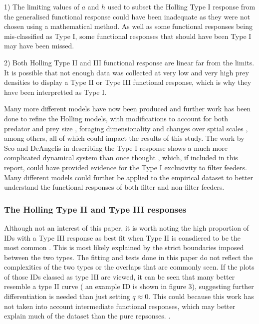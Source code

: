 \documentclass[11pt, a4paper, titlepage]{article}
\begin{document}
1) The limiting values of $a$ and $h$ used to subset the Holling Type I response from the generalised functional response could have been inadequate as they were not chosen using a mathematical method. As well as some functional responses being mis-classified as Type I, some functional responses that should have been Type I may have been missed.

2) Both Holling Type II and III functional response are linear far from the limits. It is possible that not enough data was collected at very low and very high prey densities to display a Type II or Type III functional response, which is why they have been interpretted as Type I.

Many more different models have now been produced and  further work has been done to refine the Holling models, with modifications to account for both predator and prey size \parencite{Aljetlawi2004}, foraging dimensionality \parencite{Pawar2012} and changes over sptial scales  \parencite{Rincon2017}, among others, all of which could impact the results of this study. The work by Seo and DeAngelis in describing the Type I response shows a much more complicated dynamical system than once thought \parencite{Seo2011}, which, if included in this report, could have provided evidence for the Type I exclusivity to filter feeders. Many different models could further be applied to the empirical dataset to better understand the functional responses of both filter and non-filter feeders.

\subsubsection{The Holling Type II and Type III responses}

Although not an interest of this paper, it is worth noting the high proportion of IDs with a Type III response as best fit when Type II is consdiered to be the most common \parencite{Holling1959b}. This is most likely explained by the strict boundaries imposed between the two types. The fitting and tests done in this paper do not reflect the complexities of the two types or the overlaps that are commonly seen. If the plots of those IDs classed as type III are viewed, it can be seen that many better resemble a type II curve ( an example ID is shown in figure 3), suggesting further differentiation is needed than just setting $q\approx0$. This could because this work has not taken into account intermediate functional responses, which may better explain much of the dataset than the pure repsonses. \parencite{Jeschke2004}.
\end{document}
